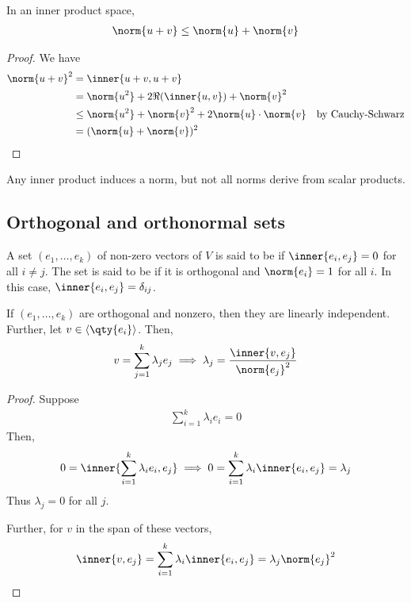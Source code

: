 \begin{corollary}
	In an inner product space,
	\begin{align*}
		\norm{u+v} \leq \norm{u} + \norm{v}
	\end{align*}
\end{corollary}
\begin{proof}
	We have
	\begin{align*}
		\norm{u+v}^2 &= \inner{u+v, u+v} \\
		&= \norm{u^2} + 2 \Re(\inner{u,v}) + \norm{v}^2 \\
		&\leq \norm{u^2} + \norm{v}^2 + 2 \norm{u} \cdot \norm{v} \quad \text{by Cauchy-Schwarz}\\
		&= (\norm{u} + \norm{v})^2
	\end{align*}
\end{proof}
\begin{remark}
	Any inner product induces a norm, but not all norms derive from scalar products.
\end{remark}

\subsection{Orthogonal and orthonormal sets}
\begin{definition}
	A set $(e_1, \dots, e_k)$ of non-zero vectors of $V$ is said to be  if $\inner{e_i, e_j} = 0$ for all $i \neq j$.
	The set is said to be  if it is orthogonal and $\norm{e_i} = 1$ for all $i$.
	In this case, $\inner{e_i, e_j} = \delta_{ij}$.
\end{definition}

\begin{lemma}
	If $(e_1, \dots, e_k)$ are orthogonal and nonzero, then they are linearly independent.
	Further, let $v \in \genset{\qty{e_i}}$.
	Then,
	\begin{align*}
		v = \sum_{j=1}^k \lambda_j e_j \implies \lambda_j = \frac{\inner{v, e_j}}{\norm{e_j}^2}
	\end{align*}
\end{lemma}

\begin{proof}
	Suppose
	\begin{align*}
		\sum_{i=1}^k \lambda_i e_i = 0
	\end{align*}
	Then,
	\begin{align*}
		0 = \inner{\sum_{i=1}^k \lambda_i e_i, e_j} \implies 0 = \sum_{i=1}^k \lambda_i \inner{e_i, e_j} = \lambda_j
	\end{align*}
	Thus $\lambda_j = 0$ for all $j$.

	Further, for $v$ in the span of these vectors,
	\begin{align*}
		\inner{v, e_j} = \sum_{i=1}^k \lambda_i \inner{e_i, e_j} = \lambda_j \norm{e_j}^2
	\end{align*}
\end{proof}

